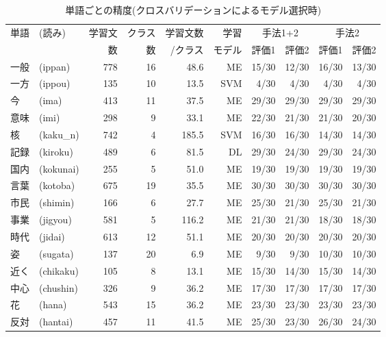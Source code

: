 \begin{table*}[htbp]
  \footnotesize
  \begin{center}
    \caption{単語ごとの精度(クロスバリデーションによるモデル選択時)}
    \label{tab:result3}
    \begin{tabular}[c]{|l@{}l|r|r|r|r|@{ }r@{ }r|@{ }r@{ }r|}
      \hline
      単語 & (読み) & 学習文 & クラス & 学習文数
      & 学習 & \multicolumn{2}{c|}{手法1+2} & \multicolumn{2}{c|}{手法2} \\
      \cline{7-10}
      & & 数 & 数 & /クラス 
      & モデル & 評価1 & 評価2 & 評価1 & 評価2 \\ 
      \hline
      一般 & (ippan) & 778 & 16 & 48.6 & ME
      & 15/30 & 12/30 & 16/30 & 13/30 \\
      一方 & (ippou) & 135 & 10 & 13.5 & SVM
      & 4/30 & 4/30 & 4/30 & 4/30 \\
      今 & (ima) & 413 & 11 & 37.5 & ME
      & 29/30 & 29/30 & 29/30 & 29/30 \\
      意味 & (imi) & 298 & 9 & 33.1 & ME 
      & 22/30 & 21/30 & 21/30 & 20/30 \\
      核 & (kaku\_n) & 742 & 4 & 185.5 & SVM 
      & 16/30 & 16/30 & 14/30 & 14/30 \\
      記録 & (kiroku) & 489 & 6 & 81.5 & DL
      & 29/30 & 24/30 & 29/30 & 24/30 \\
      国内 & (kokunai) & 255 & 5 & 51.0 & ME
      & 19/30 & 19/30 & 19/30 & 19/30 \\
      言葉 & (kotoba) & 675 & 19 & 35.5 & ME 
      & 30/30 & 30/30 & 30/30 & 30/30 \\
      市民 & (shimin) & 166 & 6 & 27.7 & ME
      & 25/30 & 21/30 & 25/30 & 21/30 \\
      事業 & (jigyou) & 581 & 5 & 116.2 & ME
      & 21/30 & 21/30 & 18/30 & 18/30 \\
      時代 & (jidai) & 613 & 12 & 51.1 & ME
      & 20/30 & 20/30 & 20/30 & 20/30 \\
      姿 & (sugata) & 137 & 20 & 6.9 & ME
      & 9/30 & 9/30 & 10/30 & 10/30 \\
      近く & (chikaku) & 105 & 8 & 13.1 & ME
      & 15/30 & 14/30 & 15/30 & 14/30 \\
      中心 & (chushin) & 326 & 9 & 36.2 & ME
      & 17/30 & 17/30 & 17/30 & 17/30 \\
      花 & (hana) & 543 & 15 & 36.2 & ME
      & 23/30 & 23/30 & 23/30 & 23/30 \\
      反対 & (hantai) & 457 & 11 & 41.5 & ME
      & 25/30 & 23/30 & 26/30 & 24/30 \\

\end{tabular}
\end{center}
\end{table*}

